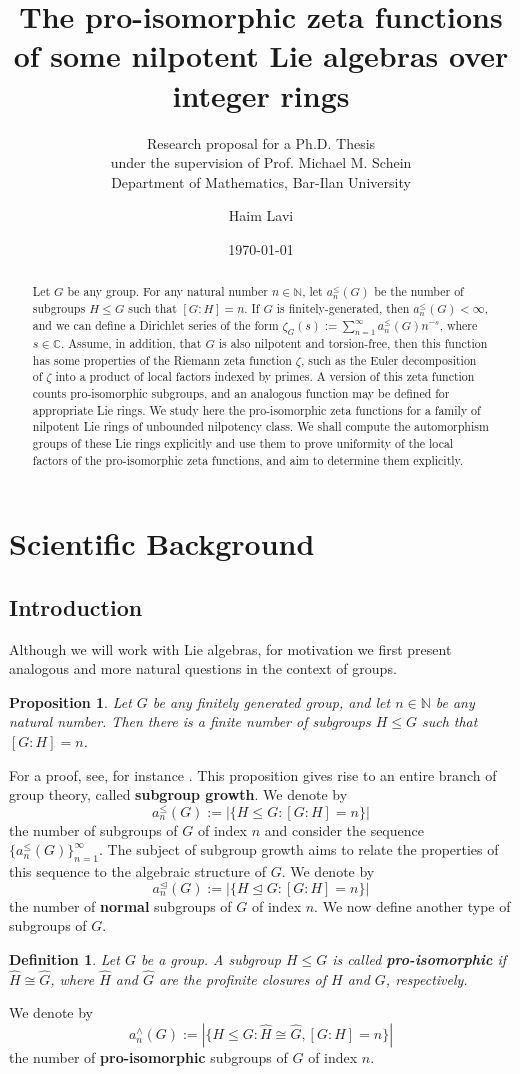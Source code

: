 \documentclass[12pt]{article}
\title{The pro-isomorphic zeta functions of some nilpotent Lie algebras over integer rings}
\subtitle{Research proposal for a Ph.D. Thesis\\
under the supervision of Prof. Michael M. Schein\\
Department of Mathematics, Bar-Ilan University}
\author{Haim Lavi}
\date{\today}
\newtheorem{proposition}[theorem]{Proposition}
\newtheorem{definition}[theorem]{Definition}
\begin{document}
\maketitle
\newpage
\tableofcontents
\newpage
\begin{abstract}
Let $G$ be any group. For any natural number $n\in\mathbb{N}$, let $a_{n}^{\leq}(G)$ be the number of subgroups $H\leq G$ such that $[G:H]=n$. If $G$ is finitely-generated, then $a_{n}^{\leq}(G)<\infty$, and we can define a Dirichlet series of the form $\zeta_G(s):=\sum_{n=1}^\infty a_{n}^{\leq}(G){n}^{-s}$, where $s\in\mathbb{C}$. Assume, in addition, that $G$ is also nilpotent and torsion-free, then this function has some properties of the Riemann zeta function $\zeta$, such as the Euler decomposition of $\zeta$ into a product of local factors indexed by primes. A version of this zeta function counts pro-isomorphic subgroups, and an analogous function may be defined for appropriate Lie rings. We study here the pro-isomorphic zeta functions for a family of nilpotent Lie rings of unbounded nilpotency class. We shall compute the automorphism groups of these Lie rings explicitly and use them to prove uniformity of the local factors of the pro-isomorphic zeta functions, and aim to determine them explicitly.
\end{abstract}
\section{Scientific Background}
\subsection{Introduction}
Although we will work with Lie algebras, for motivation we first present analogous and more natural questions in the context of groups.
\begin{proposition} \label{prop:finite.number.subgroups}
Let $G$ be any finitely generated group, and let $n\in\mathbb{N}$ be any natural number. Then there is a finite number of subgroups $H\leq G$ such that $[G:H]=n$.
\end{proposition}
For a proof, see, for instance \cite[Corollary 1.1.2]{LubotzkySegal}.
This proposition gives rise to an entire branch of group theory, called \textbf{subgroup growth}. We denote by \[a_{n}^{\leq}(G):=|\{H\leq{G} : [G:H]=n\}|\]
the number of subgroups of $G$ of index $n$ and consider the sequence $\{a_{n}^{\leq}(G)\}_{n=1}^{\infty}$. The subject of subgroup growth aims to relate the properties of this sequence to the algebraic structure of $G$. We denote by \[a_{n}^{\trianglelefteq}(G):=|\{H\trianglelefteq{G} : [G:H]=n\}|\]
the number of \textbf{normal} subgroups of $G$ of index $n$. We now define another type of subgroups of $G$.
\begin{definition}
\label{def:pro.isomorphic}
Let $G$ be a group. A subgroup $H\leq G$ is called \textbf{pro-isomorphic} if $\widehat{H}\cong\widehat{G}$, where $\widehat{H}$ and $\widehat{G}$ are the profinite closures of $H$ and $G$, respectively.
\end{definition}
We denote by \[a_{n}^{\wedge}(G):=|\{H\leq G : \widehat{H}\cong\widehat{G}, [G:H]=n\}|\]
the number of \textbf{pro-isomorphic} subgroups of $G$ of index $n$.
\end{document}

